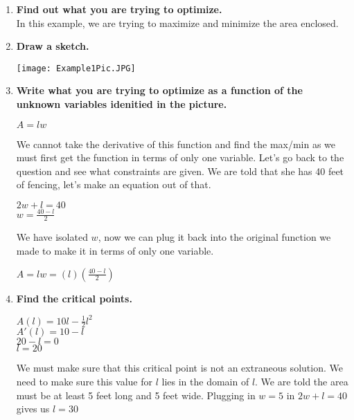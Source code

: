 \documentclass[12pt,fleqn]{book} %
\begin{document}
\begin{enumerate}
    \item {\normalsize \textbf{Find out what you are trying to optimize.}} \\
          {\small In this example, we are trying to maximize and minimize the area enclosed.}
    \item {\normalsize\textbf{Draw a sketch.}}
          \begin{center}
              \texttt{[image: Example1Pic.JPG]}
          \end{center}
    \item {\normalsize\textbf{Write what you are trying to optimize as a function of the unknown variables idenitied in the picture.}}
          \begin{center}
              $A=lw$ \\
          \end{center}
          {\small We cannot take the derivative of this function and find the max/min as we must first get the function in terms of only one variable. Let's go back to the question and see
          what constraints are given. We are told that she has 40 feet of fencing, let's make an equation out of that.}
          \begin{center}
              $2w+l=40$ \\
              $w=\frac{40-l}{2}$ \\
          \end{center}
          {\small We have isolated $w$, now we can plug it back into the original function we made to make it in terms of only one variable.}
          \begin{center}
              $A=lw=(l)(\frac{40-l}{2})$ \\
          \end{center}
    \item {\normalsize\textbf{Find the critical points.}}
          \begin{center}
              $A(l)=10l-\frac{1}{2}l^2$ \\
              $A'(l)=10-l$ \\
              $20-l=0$ \\
              $l=20$ \\
          \end{center}
          {\small We must make sure that this critical point is not an extraneous solution. We need to make sure this value for $l$ lies in the domain of $l$. We are told
          the area must be at least 5 feet long and 5 feet wide. Plugging in $w=5$ in $2w+l=40$ gives us $l=30$}

\end{enumerate}
\end{document}
